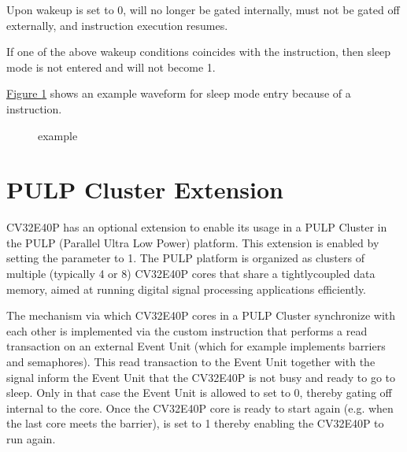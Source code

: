 \documentclass[letterpaper,10pt,english]{sphinxmanual}
\begin{document}
\sphinxAtStartPar
Upon wake\sphinxhyphen{}up  is set to 0,  will no longer be gated internally, must not be gated off externally, and
instruction execution resumes.

\sphinxAtStartPar
If one of the above wake\sphinxhyphen{}up conditions coincides with the  instruction, then sleep mode is not entered and 
will not become 1.

\sphinxAtStartPar
\hyperref[\detokenize{sleep:wfi-example}]{Figure \ref{\detokenize{sleep:wfi-example}}} shows an example waveform for sleep mode entry because of a  instruction.

\begin{figure}[htbp]
\centering
\capstart

\noindent{}
\caption{ example}\label{\detokenize{sleep:wfi-example}}\end{figure}


\section{PULP Cluster Extension}
\label{\detokenize{sleep:pulp-cluster-extension}}\label{\detokenize{sleep:pulp-cluster}}
\sphinxAtStartPar
CV32E40P has an optional extension to enable its usage in a PULP Cluster in the PULP (Parallel Ultra Low Power) platform.
This extension is enabled by setting the  parameter to 1. The PULP platform is organized as clusters of
multiple (typically 4 or 8) CV32E40P cores that share a tightly\sphinxhyphen{}coupled data memory, aimed at running digital signal processing
applications efficiently.

\sphinxAtStartPar
The mechanism via which CV32E40P cores in a PULP Cluster synchronize with each other is implemented via the custom  instruction
that performs a read transaction on an external Event Unit (which for example implements barriers and semaphores). This
read transaction to the Event Unit together with the  signal inform the Event Unit that the CV32E40P is not busy and
ready to go to sleep. Only in that case the Event Unit is allowed to set  to 0, thereby gating off 
internal to the core. Once the CV32E40P core is ready to start again (e.g. when the last core meets the barrier),  is
set to 1 thereby enabling the CV32E40P to run again.
\end{document}
